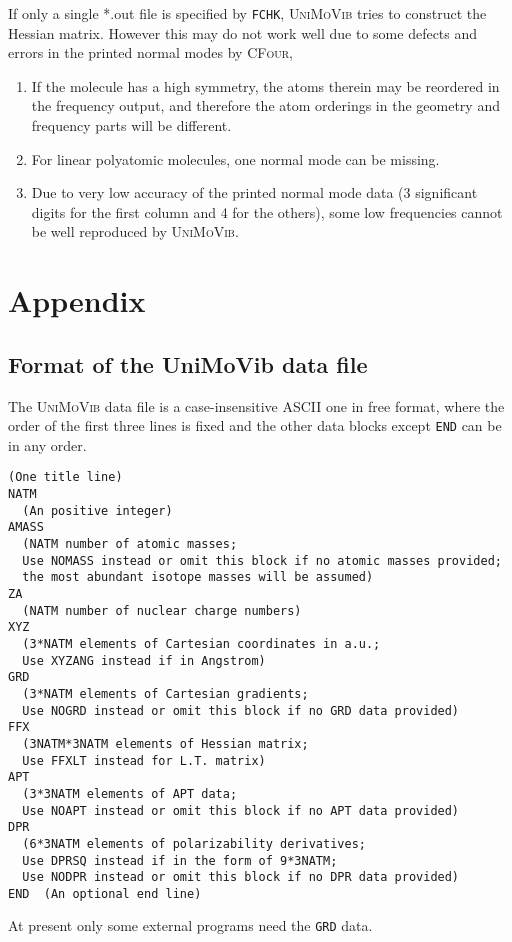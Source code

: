 \documentclass[12pt,english]{extarticle}
\begin{document}
\begin{itemize}
If only a single *.out file is specified by \verb|FCHK|, \textsc{UniMoVib} tries to construct the Hessian matrix. However this may do not work well due to some defects and errors in the printed normal modes by \textsc{CFour},
  \begin{enumerate}
    \item If the molecule has a high symmetry, the atoms therein may be reordered in the frequency output, and therefore the atom orderings in the geometry and frequency parts will be different.
    \item For linear polyatomic molecules, one normal mode can be missing.
    \item Due to very low accuracy of the printed normal mode data (3 significant digits for the first column and 4 for the others), some low frequencies cannot be well reproduced by \textsc{UniMoVib}.
  \end{enumerate}

\end{itemize}


\pagebreak{}

\appendix
\section{Appendix} \label{part:appdx}

\subsection{Format of the UniMoVib data file} \label{sec:almfmt}

The \textsc{UniMoVib} data file is a case-insensitive ASCII one in free format, where the order of the first three lines is fixed and the other data blocks except \verb|END| can be in any order.
\begin{Verbatim}[frame=single,label=Format(Ver.1.1.0 2020.10.24),labelposition=topline,rulecolor=\color{blue},fontsize=\small,baselinestretch=1.0]
(One title line)
NATM
  (An positive integer)
AMASS
  (NATM number of atomic masses;
  Use NOMASS instead or omit this block if no atomic masses provided;
  the most abundant isotope masses will be assumed)
ZA
  (NATM number of nuclear charge numbers)
XYZ
  (3*NATM elements of Cartesian coordinates in a.u.;
  Use XYZANG instead if in Angstrom)
GRD
  (3*NATM elements of Cartesian gradients;
  Use NOGRD instead or omit this block if no GRD data provided)
FFX
  (3NATM*3NATM elements of Hessian matrix;
  Use FFXLT instead for L.T. matrix)
APT
  (3*3NATM elements of APT data;
  Use NOAPT instead or omit this block if no APT data provided)
DPR
  (6*3NATM elements of polarizability derivatives;
  Use DPRSQ instead if in the form of 9*3NATM;
  Use NODPR instead or omit this block if no DPR data provided)
END  (An optional end line)
\end{Verbatim}
At present only some external programs need the \verb|GRD| data.
\end{document}
